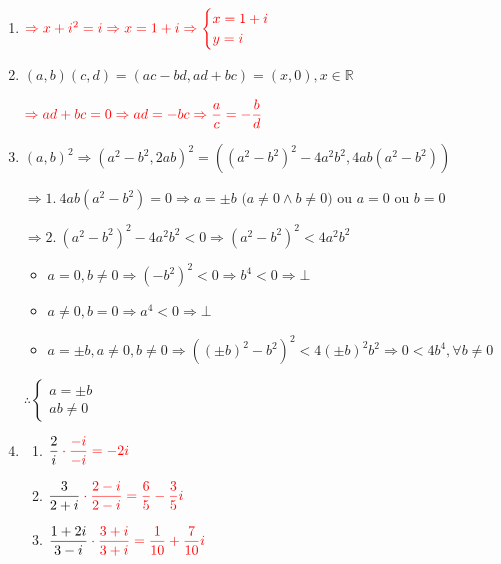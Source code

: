 \documentclass[12pt, openright, a4paper, twoside, english, brazil]{article}
\newenvironment{qitem}{
  \color{black}
\item}{\vspace{10pt}}
\newenvironment{qmitem}{
  \color{black}
\item
\begin{enumerate}[\bfseries a)]}{
\end{enumerate}\vspace{10pt}}
\begin{document}
\begin{enumerate}[\bfseries 1.]
\begin{qitem}
    $\color{red}\Rightarrow x+i^2=i \Rightarrow x=1+i \Rightarrow
    \begin{cases} x=1+i \\ y=i
    \end{cases}$
  \end{qitem}

  \begin{qitem} %
    $(a,b)(c,d) = (ac-bd, ad+bc) = (x,0), x \in \mathbb{R}$

    $\color{red}\displaystyle\Rightarrow ad+bc=0 \Rightarrow ad=-bc \Rightarrow
    \frac{a}{c} = -\frac{b}{d}$
  \end{qitem}

  \begin{qitem} %
    $(a,b)^2 \Rightarrow (a^2-b^2, 2ab)^2 = ((a^2-b^2)^2 - 4a^2b^2,
    4ab(a^2-b^2))$

    \color{red}
    $\Rightarrow 1. \ 4ab(a^2-b^2) = 0 \Rightarrow a = \pm b \text{ (}a
    \neq 0 \wedge b \neq 0\text{) ou } a=0 \text{ ou } b=0$

    $\Rightarrow 2. \ (a^2-b^2)^2 - 4a^2b^2 < 0 \Rightarrow
    (a^2-b^2)^2 < 4a^2b^2$
    \begin{itemize}
      \item $a=0, b \neq 0 \Rightarrow (-b^2)^2 < 0 \Rightarrow
        b^4 < 0 \Rightarrow \bot$
      \item $a \neq 0, b=0 \Rightarrow a^4 < 0 \Rightarrow \bot$
      \item $a = \pm b, a \neq 0, b \neq 0 \Rightarrow ((\pm
        b)^2 - b^2)^2 < 4(\pm b)^2 b^2 \Rightarrow 0 < 4b^4, \forall b \neq 0$
    \end{itemize}

    $\therefore
    \begin{cases} a = \pm b \\ ab \neq 0
    \end{cases}$
  \end{qitem}

  \begin{qmitem} %
  \item $\displaystyle \frac{2}{i}\color{red}\cdot\frac{-i}{-i}=-2i$

  \item $\displaystyle
    \frac{3}{2+i}\color{red}\cdot\frac{2-i}{2-i}=\frac65 -\frac35i$

  \item $\displaystyle
    \frac{1+2i}{3-i}\color{red}\cdot\frac{3+i}{3+i}=\frac1{10} +\frac7{10}i$


\end{qmitem}
\end{enumerate}
\end{document}
